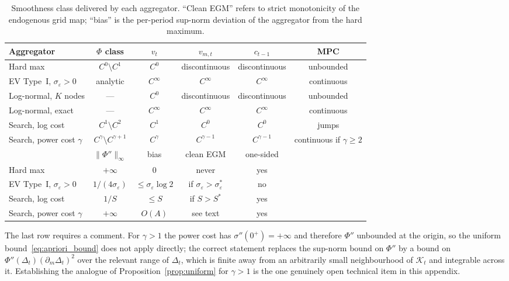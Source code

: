 \begin{table}[htbp]
\centering
\caption{Smoothness class delivered by each aggregator. ``Clean EGM'' refers to
strict monotonicity of the endogenous grid map; ``bias'' is the per-period sup-norm
deviation of the aggregator from the hard maximum.}
\label{tab:smoothclasses}
\begin{tabular}{lccccc}
\toprule
Aggregator & $\Phi$ class & $v_t$ & $v_{m,t}$ & $c_{t-1}$ & MPC \\
\midrule
Hard max & $C^{0}\setminus C^{1}$ & $C^{0}$ & discontinuous & discontinuous & unbounded \\
EV Type~I, $\sigma_\varepsilon>0$ & analytic & $C^{\infty}$ & $C^{\infty}$ & $C^{\infty}$ & continuous \\
Log-normal, $K$ nodes & --- & $C^{0}$ & discontinuous & discontinuous & unbounded \\
Log-normal, exact & --- & $C^{\infty}$ & $C^{\infty}$ & $C^{\infty}$ & continuous \\
Search, log cost & $C^{1}\setminus C^{2}$ & $C^{1}$ & $C^{0}$ & $C^{0}$ & jumps \\
Search, power cost $\gamma$ & $C^{\gamma}\setminus C^{\gamma+1}$ & $C^{\gamma}$ & $C^{\gamma-1}$ & $C^{\gamma-1}$ & continuous if $\gamma\ge2$ \\
\midrule
& $\|\Phi''\|_\infty$ & bias & clean EGM & one-sided & \\
\midrule
Hard max & $+\infty$ & $0$ & never & yes & \\
EV Type~I, $\sigma_\varepsilon>0$ & $1/(4\sigma_\varepsilon)$ & $\le\sigma_\varepsilon\log 2$ & if $\sigma_\varepsilon>\sigma_\varepsilon^{\ast}$ & no & \\
Search, log cost & $1/S$ & $\le S$ & if $S>S^{\ast}$ & yes & \\
Search, power cost $\gamma$ & $+\infty$ & $O(A)$ & see text & yes & \\
\bottomrule
\end{tabular}
\end{table}

The last row requires a comment. For $\gamma>1$ the power cost has
$\sigma''(0^{+})=+\infty$ and therefore $\Phi''$ unbounded at the origin, so the
uniform bound~\eqref{eq:apriori_bound} does not apply directly; the correct statement
replaces the sup-norm bound on $\Phi''$ by a bound on
$\Phi''(\Delta_t)(\partial_m\Delta_t)^{2}$ over the relevant range of $\Delta_t$, which
is finite away from an arbitrarily small neighbourhood of $\mathcal{K}_t$ and
integrable across it. Establishing the analogue of
Proposition~\ref{prop:uniform} for $\gamma>1$ is the one genuinely open technical item
in this appendix.

